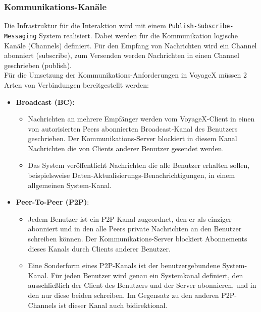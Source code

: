 \subsubsection{Kommunikations-Kanäle}
Die Infrastruktur für die Interaktion wird mit einem \texttt{Publish-Subscribe-Messaging} System realisiert. Dabei werden für die Kommunikation logische Kanäle (Channels) definiert. Für den Empfang von Nachrichten wird ein Channel abonniert (subscribe), zum Versenden werden Nachrichten in einen Channel geschrieben (publish).\\ Für die Umsetzung der Kommunikations-Anforderungen in VoyageX müssen 2 Arten von Verbindungen bereitgestellt werden:
\begin{itemize}[leftmargin=*,noitemsep,topsep=1ex,parsep=0pt,partopsep=0pt]
\item \textbf{Broadcast (BC):}
	\begin{itemize}
		\item %
Nachrichten an mehrere Empfänger werden vom VoyageX-Client in einen von autorisierten Peers abonnierten Broadcast-Kanal des Benutzers geschrieben. Der Kommunikations-Server blockiert in diesem Kanal Nachrichten die von Clients anderer Benutzer gesendet werden.
		\item Das System veröffentlicht Nachrichten die alle Benutzer erhalten sollen, beispielsweise Daten-Aktualisierungs-Benachrichtigungen, in einem allgemeinen System-Kanal.
	\end{itemize}

\item \textbf{Peer-To-Peer (P2P)}: 
	\begin{itemize}
		\item %
Jedem Benutzer ist ein P2P-Kanal zugeordnet, den er als einziger abonniert und in den alle Peers private Nachrichten an den Benutzer schreiben können. Der Kommunikations-Server blockiert Abonnements dieses Kanals durch Clients anderer Benutzer.
		\item Eine Sonderform eines P2P-Kanals ist der benutzergebundene System-Kanal. Für jeden Benutzer wird genau ein Systemkanal definiert, den ausschließlich der Client des Benutzers und der Server abonnieren, und in den nur diese beiden schreiben. Im Gegensatz zu den anderen P2P-Channels ist dieser Kanal auch bidirektional.
	\end{itemize}
\end{itemize}
